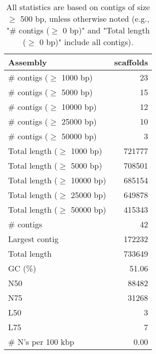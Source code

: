 \documentclass[12pt,a4paper]{article}
\begin{document}
\begin{table}[ht]
\begin{center}
\caption{All statistics are based on contigs of size $\geq$ 500 bp, unless otherwise noted (e.g., "\# contigs ($\geq$ 0 bp)" and "Total length ($\geq$ 0 bp)" include all contigs).}
\begin{tabular}{|l*{1}{|r}|}
\hline
Assembly & scaffolds \\ \hline
\# contigs ($\geq$ 1000 bp) & 23 \\ \hline
\# contigs ($\geq$ 5000 bp) & 15 \\ \hline
\# contigs ($\geq$ 10000 bp) & 12 \\ \hline
\# contigs ($\geq$ 25000 bp) & 10 \\ \hline
\# contigs ($\geq$ 50000 bp) & 3 \\ \hline
Total length ($\geq$ 1000 bp) & 721777 \\ \hline
Total length ($\geq$ 5000 bp) & 708501 \\ \hline
Total length ($\geq$ 10000 bp) & 685154 \\ \hline
Total length ($\geq$ 25000 bp) & 649878 \\ \hline
Total length ($\geq$ 50000 bp) & 415343 \\ \hline
\# contigs & 42 \\ \hline
Largest contig & 172232 \\ \hline
Total length & 733649 \\ \hline
GC (\%) & 51.06 \\ \hline
N50 & 88482 \\ \hline
N75 & 31268 \\ \hline
L50 & 3 \\ \hline
L75 & 7 \\ \hline
\# N's per 100 kbp & 0.00 \\ \hline
\end{tabular}
\end{center}
\end{table}
\end{document}
